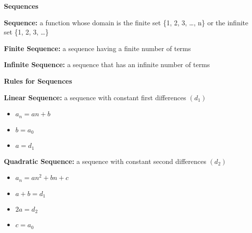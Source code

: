 \begin{center}
\textbf{Sequences}
\end{center}

\vspace*{1ex}

\textbf{Sequence:} a function whose domain is the finite set \{1, 2, 3, \ldots, n\} or the infinite set \{1, 2, 3, \ldots \}

\textbf{Finite Sequence:} a sequence having a finite number of terms 


\textbf{Infinite Sequence:} a sequence that has an infinite number of terms

\vspce 
\vspce 

\begin{center}
\textbf{Rules for Sequences}
\end{center} 

\textbf{Linear Sequence:} a sequence with constant first differences $(d_{1})$ 
\begin{itemize}
\item $a_{n} = an + b$
\item $b = a_{0}$
\item $a = d_{1}$
\end{itemize}

\vspce 

\textbf{Quadratic Sequence:} a sequence with constant second differences $(d_{2})$ 
\begin{itemize}
\item $a_{n} = an^{2} + bn + c$
\item $a+b = d_{1}$
\item $2a = d_{2}$
\item $c = a_{0}$
\end{itemize}




